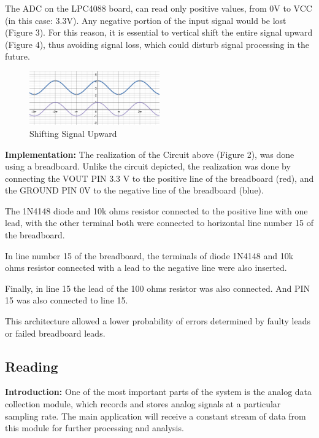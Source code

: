 \documentclass{cce2014-design}
\begin{document}
{{	  The ADC on the LPC4088 board, can read only positive values,
	  from 0V to VCC (in this case: 3.3V). Any negative portion of the
	  input signal
	  would be lost (Figure 3). For this reason, it is essential to
	  vertical shift
	  the
	  entire signal upward (Figure 4), thus avoiding signal loss, which
	  could disturb
	  signal
	  processing in the future.

	  \begin{figure}[H]
		  \centering
		  \includegraphics[width=0.5\textwidth]{shift-upward}
		  \caption{Shifting Signal Upward}
		  \label{fig: Shift Upward}
	  \end{figure}

	  \textbf{Implementation:}
	  The realization of the Circuit above (Figure 2), was done using
	  a breadboard.
	  Unlike the circuit depicted, the realization was done by
	  connecting the VOUT PIN 3.3 V to the positive line of the breadboard
	  (red), and
	  the GROUND PIN 0V to the negative line of the breadboard (blue).

	  The 1N4148 diode and 10k ohms resistor connected to the
	  positive line with one lead, with the other terminal both were
	  connected to
	  horizontal line number 15 of the breadboard.

	  In line number 15 of the breadboard, the terminals of diode
	  1N4148 and 10k ohms resistor connected with a lead to the negative
	  line were
	  also inserted.

	  Finally, in line 15 the lead of the 100 ohms resistor was also
	  connected. And PIN 15 was also connected to line 15.

	  This architecture allowed a lower probability of errors
	  determined by faulty leads or failed breadboard leads.

  }
  \subsection{Reading}
  {
	  \textbf{Introduction:}
	  One of the most important parts of the system is the analog
	  data collection module, which records and stores analog signals at a
	  particular
	  sampling rate. The main application will receive a constant stream of
	  data from
	  this module for further processing and analysis.

}}
\end{document}
